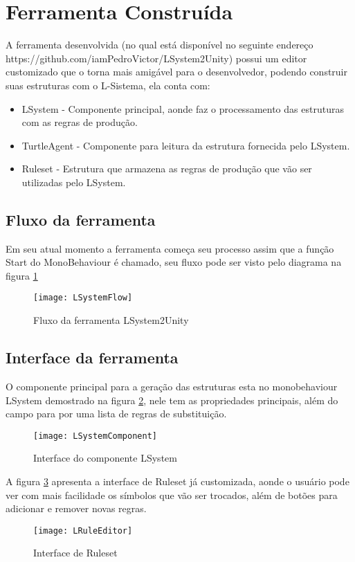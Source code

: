 \section{Ferramenta Construída}

A ferramenta desenvolvida (no qual está disponível no seguinte endereço https://github.com/iamPedroVictor/LSystem2Unity) possui um editor customizado que o torna mais amigável para o desenvolvedor, podendo construir suas estruturas com o L-Sistema, ela conta com:
\begin{itemize}
	\item LSystem - Componente principal, aonde faz o processamento das estruturas com as regras de produção.
	\item TurtleAgent - Componente para leitura da estrutura fornecida pelo LSystem.
	\item Ruleset - Estrutura que armazena as regras de produção que vão ser utilizadas pelo LSystem.
\end{itemize}

\subsection{Fluxo da ferramenta}
Em seu atual momento a ferramenta começa seu processo assim que a função Start do MonoBehaviour é chamado, seu fluxo pode ser visto pelo diagrama na figura \ref{LSystemFlow}

\begin{figure}[!h]
	\centering
	\texttt{[image: LSystemFlow]}
	\caption{Fluxo da ferramenta LSystem2Unity}
	\label{LSystemFlow}
\end{figure}

\subsection{Interface da ferramenta}
O componente principal para a geração das estruturas esta no monobehaviour LSystem demostrado na figura \ref{LSystemComponent}, nele tem as propriedades principais, além do campo para por uma lista de regras de substituição.

\begin{figure}[!h]
	\centering
	\texttt{[image: LSystemComponent]}
	\caption{Interface do componente LSystem}
	\label{LSystemComponent}
\end{figure}

A figura \ref{LRuleSet} apresenta a interface de Ruleset já customizada, aonde o usuário pode ver com mais facilidade os símbolos que vão ser trocados, além de botões para adicionar e remover novas regras.
\begin{figure}[!h]
	\centering
	\texttt{[image: LRuleEditor]}
	\caption{Interface de Ruleset}
	\label{LRuleSet}
\end{figure}

